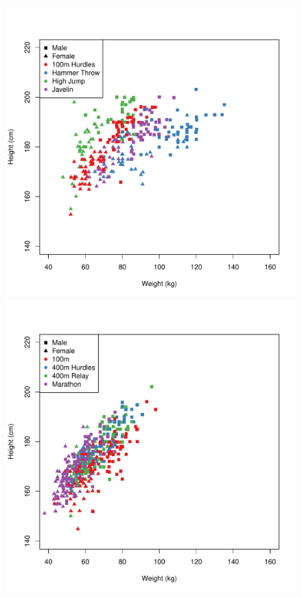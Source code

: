 \begin{center}
\begin{figure}
\begin{minipage}{0.2\textwidth}
\begin{center}
      \end{center}
    \end{minipage}
    \hspace{0.05\textwidth}
    \begin{minipage}{0.2\textwidth}
      \begin{center}
        \includegraphics[scale=0.20]{../graphics/javelin.pdf}
      \end{center}
    \end{minipage}
    \hspace{0.05\textwidth}
    \begin{minipage}{0.2\textwidth}
      \begin{center}
        \includegraphics[scale=0.20]{../graphics/marathon.pdf}

\end{center}
\end{minipage}
\end{figure}
\end{center}
